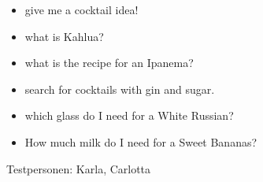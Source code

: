 \documentclass[12pt,letterpaper]{article}
\begin{document}
\begin{adjustwidth}{1cm}{1cm}
\begin{itemize}
\item give me a cocktail idea!

\item what is Kahlua?

\item what is the recipe for an Ipanema?

\item search for cocktails with gin and sugar.

\item which glass do I need for a White Russian?

\item How much milk do I need for a Sweet Bananas?
\end{itemize}

\end{adjustwidth}

Testpersonen:
    Karla, Carlotta
\end{document}
